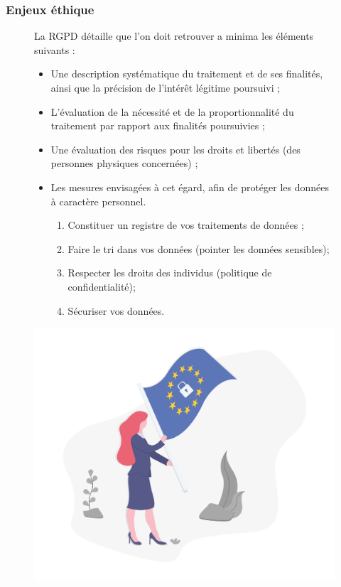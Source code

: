 \documentclass[9pt]{beamer}
\begin{document}
\begin{frame}
	\frametitle{Enjeux éthique}
\begin{figure}[!htb]
   \begin{minipage}{0.7\textwidth}
La RGPD détaille que l’on doit retrouver a minima les éléments suivants :
\begin{itemize}
\item Une description systématique du traitement et de ses finalités, ainsi que la précision de l’intérêt légitime poursuivi ;
\item L’évaluation de la nécessité et de la proportionnalité du traitement par rapport aux finalités poursuivies ;
\item Une évaluation des risques pour les droits et libertés (des personnes physiques concernées) ;
\item Les mesures envisagées à cet égard, afin de protéger les données à caractère personnel.
\begin{enumerate}
\item Constituer un registre de vos traitements de données ;
\item Faire le tri dans vos données (pointer les données sensibles);
\item Respecter les droits des individus (politique de confidentialité);
\item Sécuriser vos données.
\end{enumerate}
\end{itemize}
 \end{minipage}\hfill
   \begin{minipage}{0.3\textwidth}
     \centering
     \includegraphics[width=1\linewidth]{../media/gdpr}
     \label{Fig:gdpr}
   \end{minipage}
\end{figure}
\end{frame}
\end{document}
